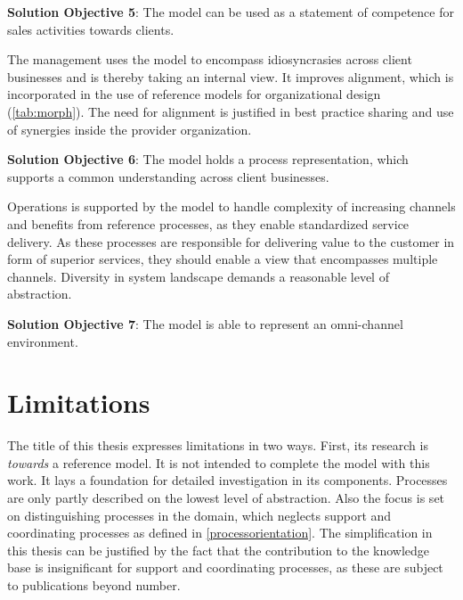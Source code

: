 \hfill\begin{minipage}{\dimexpr\textwidth-1.2cm}
	\textbf{Solution Objective 5}: The model can be used as a statement of competence for sales activities towards clients.
	
\end{minipage}

 The management uses the model to encompass idiosyncrasies across client businesses and is thereby taking an internal view. It improves alignment, which is incorporated in the use of reference models for organizational design (\cf \Tab \ref{tab:morph}). The need for alignment is justified in best practice sharing and use of synergies inside the provider organization.
 
 
\hfill\begin{minipage}{\dimexpr\textwidth-1.2cm}
 \textbf{Solution Objective 6}: The model holds a process representation, which supports a common understanding across client businesses. 
 
\end{minipage}


 Operations is supported by the model to handle complexity of increasing channels and benefits from reference processes, as they enable standardized service delivery. As these processes are responsible for delivering value to the customer in form of superior services, they should enable a view that encompasses multiple channels. Diversity in system landscape demands a reasonable level of abstraction. 
 
	\hfill\begin{minipage}{\dimexpr\textwidth-1.2cm}
	\textbf{Solution Objective 7}: The model is able to represent an omni-channel environment. 
\end{minipage}

\section{Limitations}

The title of this thesis expresses limitations in two ways. First, its research is \textit{towards} a reference model. It is not intended to complete the model with this work. It lays a foundation for detailed investigation in its components. Processes are only partly described on the lowest level of abstraction. Also the focus is set on distinguishing processes in the domain, which neglects support and coordinating processes as defined in \ref{processorientation}. The simplification in this thesis can be justified by the fact that the contribution to the knowledge base is insignificant for support and coordinating processes, as these are subject to publications beyond number. 

